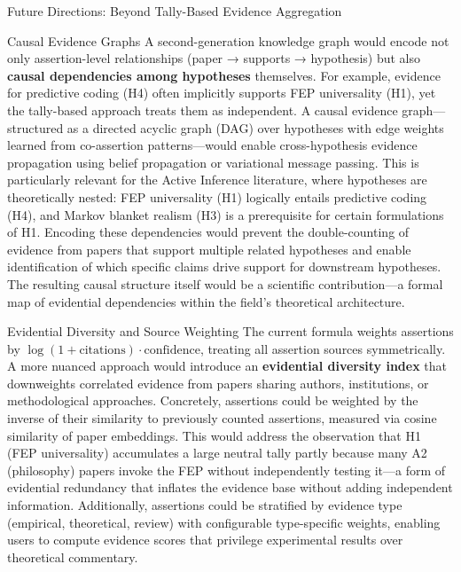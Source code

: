 \documentclass[
  ignorenonframetext,
]{beamer}
\begin{document}
\begin{frame}[fragile]{Future Directions: Beyond Tally-Based Evidence
Aggregation}
\begin{block}{Causal Evidence Graphs}
\protect{}\label{causal-evidence-graphs}
A second-generation knowledge graph would encode not only
assertion-level relationships (paper → supports → hypothesis) but also
\textbf{causal dependencies among hypotheses} themselves. For example,
evidence for predictive coding (H4) often implicitly supports FEP
universality (H1), yet the tally-based approach treats them as
independent. A causal evidence graph---structured as a directed acyclic
graph (DAG) over hypotheses with edge weights learned from co-assertion
patterns---would enable cross-hypothesis evidence propagation using
belief propagation or variational message passing. This is particularly
relevant for the Active Inference literature, where hypotheses are
theoretically nested: FEP universality (H1) logically entails predictive
coding (H4), and Markov blanket realism (H3) is a prerequisite for
certain formulations of H1. Encoding these dependencies would prevent
the double-counting of evidence from papers that support multiple
related hypotheses and enable identification of which specific claims
drive support for downstream hypotheses. The resulting causal structure
itself would be a scientific contribution---a formal map of evidential
dependencies within the field's theoretical architecture.
\end{block}

\begin{block}{Evidential Diversity and Source Weighting}
\protect{}\label{evidential-diversity-and-source-weighting}
The current formula weights assertions by
\(\log(1 + \text{citations}) \cdot \text{confidence}\), treating all
assertion sources symmetrically. A more nuanced approach would introduce
an \textbf{evidential diversity index} that downweights correlated
evidence from papers sharing authors, institutions, or methodological
approaches. Concretely, assertions could be weighted by the inverse of
their similarity to previously counted assertions, measured via cosine
similarity of paper embeddings. This would address the observation that
H1 (FEP universality) accumulates a large neutral tally partly because
many A2 (philosophy) papers invoke the FEP without independently testing
it---a form of evidential redundancy that inflates the evidence base
without adding independent information. Additionally, assertions could
be stratified by evidence type (empirical, theoretical, review) with
configurable type-specific weights, enabling users to compute evidence
scores that privilege experimental results over theoretical commentary.
\end{block}


\end{frame}
\end{document}
